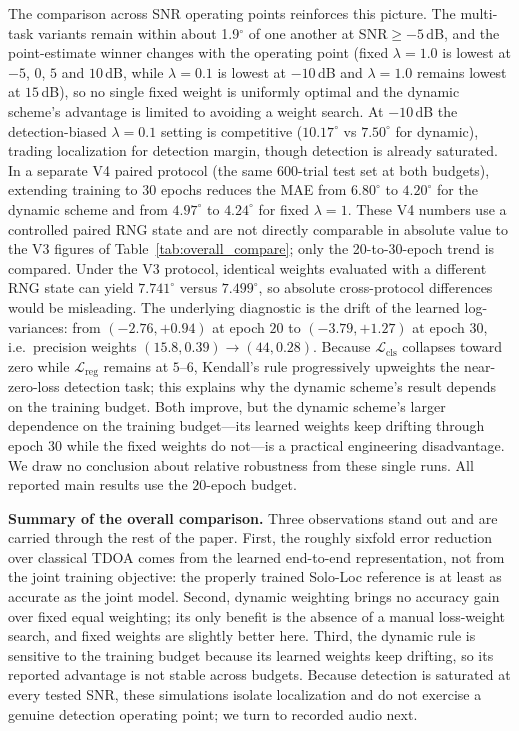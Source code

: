 \documentclass[5p,twocolumn]{elsarticle}
\begin{document}
The comparison across SNR operating points reinforces this picture. The multi-task variants remain within about 1.9$^\circ$ of one another at SNR$\geq-5$\,dB, and the point-estimate winner changes with the operating point (fixed $\lambda=1.0$ is lowest at $-5$, $0$, $5$ and $10$\,dB, while $\lambda=0.1$ is lowest at $-10$\,dB and $\lambda=1.0$ remains lowest at $15$\,dB), so no single fixed weight is uniformly optimal and the dynamic scheme's advantage is limited to avoiding a weight search. At $-10$\,dB the detection-biased $\lambda=0.1$ setting is competitive ($10.17^\circ$ vs $7.50^\circ$ for dynamic), trading localization for detection margin, though detection is already saturated. In a separate V4 paired protocol (the same $600$-trial test set at both budgets), extending training to $30$ epochs reduces the MAE from $6.80^\circ$ to $4.20^\circ$ for the dynamic scheme and from $4.97^\circ$ to $4.24^\circ$ for fixed $\lambda=1$. These V4 numbers use a controlled paired RNG state and are not directly comparable in absolute value to the V3 figures of Table~\ref{tab:overall_compare}; only the 20-to-30-epoch trend is compared. Under the V3 protocol, identical weights evaluated with a different RNG state can yield $7.741^\circ$ versus $7.499^\circ$, so absolute cross-protocol differences would be misleading. The underlying diagnostic is the drift of the learned log-variances: from $(-2.76,+0.94)$ at epoch $20$ to $(-3.79,+1.27)$ at epoch $30$, i.e.\ precision weights $(15.8,0.39)\to(44,0.28)$. Because $\mathcal{L}_{\mathrm{cls}}$ collapses toward zero while $\mathcal{L}_{\mathrm{reg}}$ remains at $5$--$6$, Kendall's rule progressively upweights the near-zero-loss detection task; this explains why the dynamic scheme's result depends on the training budget. Both improve, but the dynamic scheme's larger dependence on the training budget---its learned weights keep drifting through epoch $30$ while the fixed weights do not---is a practical engineering disadvantage. We draw no conclusion about relative robustness from these single runs. All reported main results use the $20$-epoch budget.

\textbf{Summary of the overall comparison.} Three observations stand out and are carried through the rest of the paper. First, the roughly sixfold error reduction over classical TDOA comes from the learned end-to-end representation, not from the joint training objective: the properly trained Solo-Loc reference is at least as accurate as the joint model. Second, dynamic weighting brings no accuracy gain over fixed equal weighting; its only benefit is the absence of a manual loss-weight search, and fixed weights are slightly better here. Third, the dynamic rule is sensitive to the training budget because its learned weights keep drifting, so its reported advantage is not stable across budgets. Because detection is saturated at every tested SNR, these simulations isolate localization and do not exercise a genuine detection operating point; we turn to recorded audio next.
\end{document}
